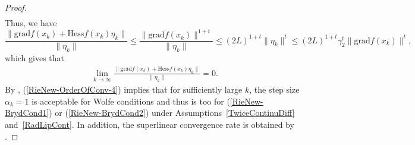 \documentclass[11pt]{article}
\numberwithin{equation}{section}
\begin{document}
\begin{proof}
\begin{align}
    \end{align}
    Thus, we have 
  	\[
  		\frac{ \|\mathrm{grad}f(x_k)+ \mathrm{Hess}f(x_k)\eta_k \| }{\|\eta_k\|}\le \frac{\|\mathrm{grad}f(x_k)\|^{1+t}}{\|\eta_k\|}\le {(2L)^{1+t}\|\eta_k\|^t} \le (2L)^{1+t}\gamma_2^t\|\mathrm{grad}f(x_k)\|^t,
  	\]
  	which gives that 
  	\begin{align}
  		\label{RieNew-OrderOfConv-4}
  		\lim_{k\rightarrow \infty}\frac{ \|\mathrm{grad}f(x_k)+ \mathrm{Hess}f(x_k)\eta_k \| }{\|\eta_k\|}=0.
  	\end{align}
  	By \cite[Proposition 5]{ring_optimization_2012}, (\ref{RieNew-OrderOfConv-4}) implies that for sufficiently large $k$, the step size $\alpha_k=1$ is acceptable for Wolfe conditions and thus is too for (\ref{RieNew-BrydCond1}) or (\ref{RieNew-BrydCond2}) under Assumptions~\ref{TwiceContinuDiff} and~\ref{RadLipCont}.   
  	In addition, the superlinear convergence rate is obtained by \cite[Proposition 8]{ring_optimization_2012}.
  	

\end{proof}
\end{document}
